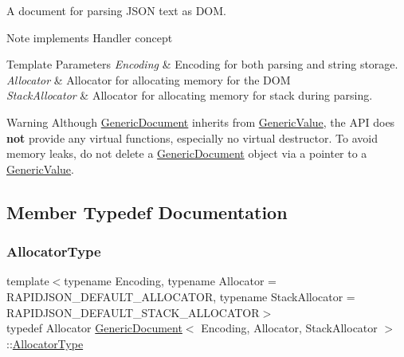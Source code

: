 A document for parsing J\+S\+ON text as D\+OM. 

\begin{DoxyNote}{Note}
implements Handler concept 
\end{DoxyNote}

\begin{DoxyTemplParams}{Template Parameters}
{\em Encoding} & Encoding for both parsing and string storage. \\
\hline
{\em Allocator} & Allocator for allocating memory for the D\+OM \\
\hline
{\em Stack\+Allocator} & Allocator for allocating memory for stack during parsing. \\
\hline
\end{DoxyTemplParams}
\begin{DoxyWarning}{Warning}
Although \hyperlink{classGenericDocument}{Generic\+Document} inherits from \hyperlink{classGenericValue}{Generic\+Value}, the A\+PI does {\bfseries not} provide any virtual functions, especially no virtual destructor. To avoid memory leaks, do not {\ttfamily delete} a \hyperlink{classGenericDocument}{Generic\+Document} object via a pointer to a \hyperlink{classGenericValue}{Generic\+Value}. 
\end{DoxyWarning}


\subsection{Member Typedef Documentation}
\mbox{\label{classGenericDocument_a35155b912da66ced38d22e2551364c57}} 
\subsubsection{\texorpdfstring{Allocator\+Type}{AllocatorType}}
{\footnotesize\ttfamily template$<$typename Encoding, typename Allocator = R\+A\+P\+I\+D\+J\+S\+O\+N\+\_\+\+D\+E\+F\+A\+U\+L\+T\+\_\+\+A\+L\+L\+O\+C\+A\+T\+OR, typename Stack\+Allocator = R\+A\+P\+I\+D\+J\+S\+O\+N\+\_\+\+D\+E\+F\+A\+U\+L\+T\+\_\+\+S\+T\+A\+C\+K\+\_\+\+A\+L\+L\+O\+C\+A\+T\+OR$>$ \\
typedef Allocator \hyperlink{classGenericDocument}{Generic\+Document}$<$ Encoding, Allocator, Stack\+Allocator $>$\+::\hyperlink{classGenericValue_a7beb83860c1b8d2a0e2a7da9796b2fa1}{Allocator\+Type}}



